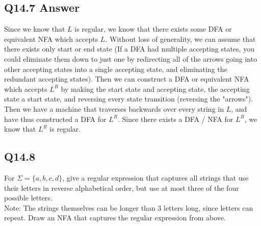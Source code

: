 \documentclass{article}
\begin{document}
\subsection*{Q14.7 Answer}
Since we know that $L$ is regular, we know that there exists some DFA or equivalent NFA which accepts $L$. Without loss of generality, we can
assume that there exists only start or end state (If a DFA had multiple accepting states, you could eliminate them down to just one 
by redirecting all of the arrows going into other accepting states into a single accepting state, and eliminating the redundant accepting
states). Then we can construct a DFA or equivalent NFA which accepts $L^R$ by making the start state and accepting state, the accepting state
a start state, and reversing every state transition (reversing the "arrows"). Then we have a machine that traverses backwards over every
string in $L$, and have thus constructed a DFA for $L^R$. Since there exists a DFA / NFA for $L^R$, we know that $L^R$ is regular.
\newpage
{}
\subsection*{Q14.8}
For $\Sigma=\{a,b,c,d\}$, give a regular expression that captures all strings that use their letters in reverse alphabetical order, but use at most three of the four possible letters.
\\ Note: The strings themselves can be longer than 3 letters long, since letters can repeat.
 Draw an NFA that captures the regular expression from above.
\newpage
{}
\end{document}
